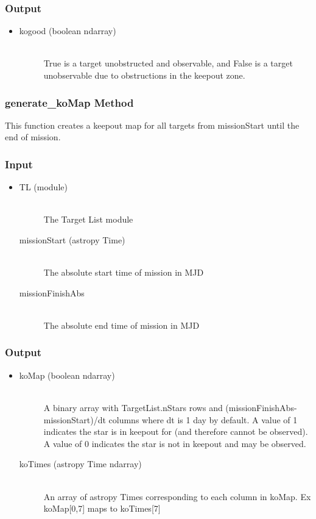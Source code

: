 \documentclass[cleanfoot]{asme2ej}
\begin{document}
\subsubsection*{Output}
\begin{itemize}
\item 
\begin{description}
    \item[kogood (boolean ndarray)] \hfill \\ True is a target unobstructed and observable, and False is a target unobservable due to obstructions in the keepout zone.
\end{description}
\end{itemize}

\subsubsection{generate\_koMap Method} \label{sec:generatekoMaptask}
This function creates a keepout map for all targets from missionStart until the end of mission.
\subsubsection*{Input}
\begin{itemize}
\item 
\begin{description}
    \item[TL (module)] \hfill \\ The Target List module
    \item[missionStart (astropy Time)] \hfill \\ The absolute start time of mission in MJD
    \item[missionFinishAbs] \hfill \\ The absolute end time of mission in MJD
\end{description}
\end{itemize}
\subsubsection*{Output}
\begin{itemize}
\item 
\begin{description}
    \item[koMap (boolean ndarray)] \hfill \\ A binary array with TargetList.nStars rows and (missionFinishAbs-missionStart)/dt columns where dt is 1 day by default. A value of 1 indicates the star is in keepout for (and therefore cannot be observed). A value of 0 indicates the star is not in keepout and may be observed.
    \item[koTimes (astropy Time ndarray)] \hfill \\ An array of astropy Times corresponding to each column in koMap. Ex koMap[0,7] maps to koTimes[7] 
\end{description}
\end{itemize}
\end{document}
